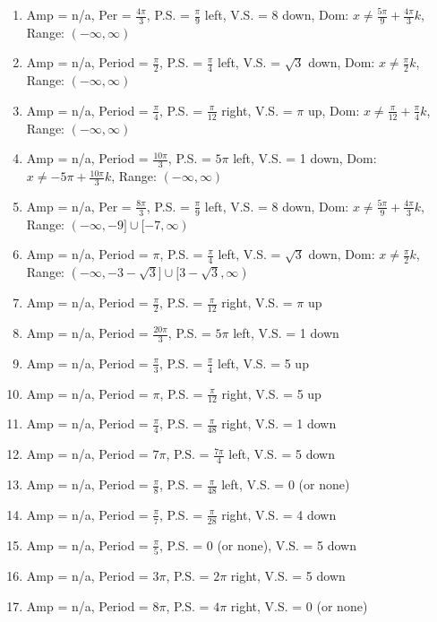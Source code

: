 \begin{enumerate}
	\item Amp = n/a, Per = $\frac{4\pi}{3}$, P.S. = $\frac{\pi}{9}$ left, V.S. = 8 down, Dom: $x \neq \frac{5\pi}{9}+\frac{4\pi}{3}k$, Range: $(-\infty, \infty)$
	\item Amp = n/a, Period = $\frac{\pi}{2}$, P.S. = $\frac{\pi}{4}$ left, V.S. = $\sqrt{3}$ down, Dom: $x \neq \frac{\pi}{2}k$, Range: $(-\infty, \infty)$
	\item Amp = n/a, Period = $\frac{\pi}{4}$, P.S. = $\frac{\pi}{12}$ right, V.S. = $\pi$ up, Dom: $x \neq \frac{\pi}{12}+\frac{\pi}{4}k$, Range: $(-\infty, \infty)$
	\item Amp = n/a, Period = $\frac{10\pi}{3}$, P.S. = $5\pi$ left, V.S. = 1 down, Dom: $x \neq -5\pi + \frac{10\pi}{3}k$, Range: $(-\infty, \infty)$
	\item Amp = n/a, Per = $\frac{8\pi}{3}$, P.S. = $\frac{\pi}{9}$ left, V.S. = 8 down, Dom: $x \neq \frac{5\pi}{9}+\frac{4\pi}{3}k$, Range: $(-\infty, -9] \cup [-7, \infty)$
	\item Amp = n/a, Period = $\pi$, P.S. = $\frac{\pi}{4}$ left, V.S. = $\sqrt{3}$ down, Dom: $x \neq \frac{\pi}{2}k$, Range: $(-\infty, -3-\sqrt{3}] \cup [3-\sqrt{3}, \infty)$
	\item Amp = n/a, Period = $\frac{\pi}{2}$, P.S. = $\frac{\pi}{12}$ right, V.S. = $\pi$ up
	\item Amp = n/a, Period = $\frac{20\pi}{3}$, P.S. = $5\pi$ left, V.S. = 1 down
	\item Amp = n/a, Period = $\frac{\pi}{3}$, P.S. = $\frac{\pi}{4}$ left, V.S. = 5 up
	\item Amp = n/a, Period = $\pi$, P.S. = $\frac{\pi}{12}$ right, V.S. = 5 up
	\item Amp = n/a, Period = $\frac{\pi}{4}$, P.S. = $\frac{\pi}{48}$ right, V.S. = 1 down
	\item Amp = n/a, Period = $7\pi$, P.S. = $\frac{7\pi}{4}$ left, V.S. = 5 down
	\item Amp = n/a, Period = $\frac{\pi}{8}$, P.S. = $\frac{\pi}{48}$ left, V.S. = 0 (or none)
	\item Amp = n/a, Period = $\frac{\pi}{7}$, P.S. = $\frac{\pi}{28}$ right, V.S. = 4 down
	\item Amp = n/a, Period = $\frac{\pi}{5}$, P.S. = 0 (or none), V.S. = 5 down
	\item Amp = n/a, Period = $3\pi$, P.S. = $2\pi$ right, V.S. = 5 down
	\item Amp = n/a, Period = $8\pi$, P.S. = $4\pi$ right, V.S. = 0 (or none)

\end{enumerate}
